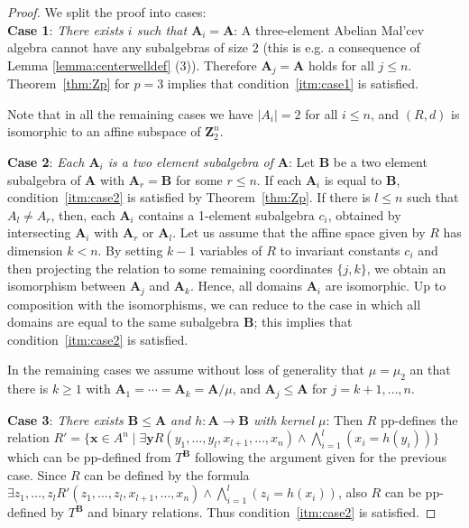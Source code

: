 \documentclass[12pt]{amsart}
\theoremstyle{definition}
\theoremstyle{definition}
\newcommand{\alg}[1]{\mathbf{#1}}
\newcommand{\algB}{\alg{B}}
\begin{document}
\begin{proof}
We split the proof into cases: \\
\textbf{Case 1}: \textit{There exists $i$ such that $\alg{A}_i = \alg{A}$}:
A three-element Abelian Mal'cev algebra cannot have any subalgebras of size $2$ (this is e.g. a consequence of Lemma \ref{lemma:centerwelldef} (3)). Therefore 
$\alg{A}_j = \alg{A}$ holds for all $j\leq n$. Theorem~\ref{thm:Zp} for $p=3$
implies that condition~\eqref{itm:case1} is satisfied. 

Note that in all the remaining cases we have $|A_i|=2$ for all $i\leq n$, and $(R,d)$ is isomorphic to an affine subspace of $\mathbf{Z}_2^n$.

\textbf{Case 2}: \textit{Each $\alg{A}_i$ is a two element subalgebra of $\alg{A}$}:  
Let $\alg{B}$ be a two element subalgebra of $\alg{A}$ with $\alg{A}_r = \alg{B}$ for some $r\leq n$.
If each $\alg{A}_i$ is equal to $\alg{B}$, condition~\eqref{itm:case2} is satisfied by Theorem~\ref{thm:Zp}.
If there is $l\leq n$ such that $A_l\neq A_r$,
then, each $\alg{A}_i$ contains a 1-element subalgebra $c_i$, obtained by intersecting $\alg{A}_i$ with $\alg{A}_r$ or $\alg{A}_l$.
Let us assume that the affine space given by $R$ has dimension $k<n$. 
By setting $k-1$ variables of $R$ to invariant constants $c_i$ and 
then projecting the relation to some remaining coordinates $\{j,k\}$, 
we obtain an isomorphism between $\alg{A}_j$ and $\alg{A}_k$. 
Hence, all domains $\alg{A}_i$ are isomorphic.  
Up to composition with the isomorphisms, we can reduce to the case in which all domains are equal to the same subalgebra $\alg{B}$; this implies that condition~\eqref{itm:case2} is satisfied.


In the remaining cases we assume without loss of generality that $\mu = \mu_2$ an that there is $k\geq 1$
with $\alg{A}_1 = \cdots = \alg{A}_k = \alg{A}/\mu$, and $\alg{A}_j \leq \alg{A}$ for $j = k+1,\ldots,n$. 

\textbf{Case 3}: \textit{There exists $\alg{B}\leq\alg{A}$ and $h\colon \alg{A}\to \alg{B}$ with kernel $\mu$}: Then $R$ pp-defines the relation $R' = \{\boldsymbol{x} \in A^n \mid \exists \boldsymbol{y} R(y_1,\ldots,y_l,x_{l+1},\ldots,x_n) \land \bigwedge_{i=1}^l (x_i = h(y_i))\}$ which can be pp-defined from $T^{\algB}$ following the argument given for the previous case.
Since $R$ can be defined by the formula $\exists z_1,\ldots,z_l R'(z_1,\ldots,z_l,x_{l+1},\ldots,x_n) \land \bigwedge_{i=1}^l (z_i = h(x_i))$, also $R$ can be pp-defined by $T^{\alg B}$ and binary relations. Thus condition~\eqref{itm:case2} is satisfied. 


\end{proof}
\end{document}
